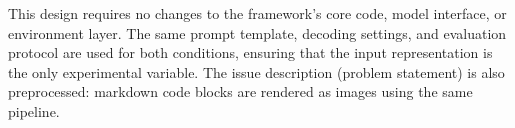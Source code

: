 This design requires no changes to the framework's core code, model interface, or environment layer. The same prompt template, decoding settings, and evaluation protocol are used for both conditions, ensuring that the input representation is the only experimental variable. The issue description (problem statement) is also preprocessed: markdown code blocks are rendered as images using the same pipeline.
